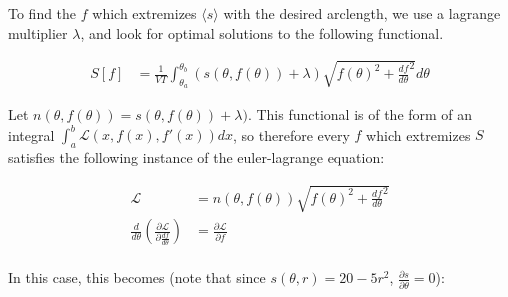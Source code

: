 \documentclass{article}
\begin{document}
To find the $f$ which extremizes $\langle s \rangle$ with the desired arclength,
	we use a lagrange multiplier $\lambda$, and look for optimal solutions
	to the following functional.

\begin{align}
S[f] & = \frac{1}{VT} \int_{\theta_a}^{\theta_b} \left( s(\theta, f(\theta)) + \lambda \right)
	\sqrt{f(\theta)^2 + \frac{df}{d\theta}^2} d\theta \label{eq:action-polar}
\end{align}

Let $n(\theta, f(\theta)) = s(\theta, f(\theta)) + \lambda)$.
This functional is of the form of an integral $\int_a^b \mathcal{L}(x,f(x),f'(x)) dx$,
	so therefore every $f$ which extremizes $S$ satisfies the following
	instance of the euler-lagrange equation:

\begin{align}
\mathcal{L} & = n(\theta, f(\theta)) \sqrt{f(\theta)^2 + \frac{df}{d\theta}^2} \\
\frac{d}{d\theta} \left( \frac{\partial \mathcal{L}}
		{\partial \frac{df}{d\theta}} \right)
	& = \frac{\partial \mathcal{L}}{\partial f} \nonumber \\
\end{align}

In this case, this becomes (note that since $s(\theta, r) = 20 - 5 r^2$, 
	$\frac{\partial s}{\partial \theta} = 0$):
\end{document}
